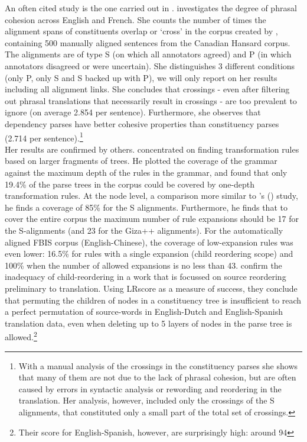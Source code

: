 \documentclass{report}
\theoremstyle{definition}
\theoremstyle{plain}
\def\citepos#1{\citeauthor{#1}'s (\citeyear{#1})}
\begin{document}
An often cited study is the one carried out in \cite{fox2002phrasal}. \citeauthor{fox2002phrasal} investigates the degree of phrasal cohesion across English and French. She counts the number of times the alignment spans of constituents overlap or `cross' in the corpus created by \cite{och2000improved}, containing 500 manually aligned sentences from the Canadian Hansard corpus. The alignments are of type S (on which all annotators agreed) and P (in which annotators disagreed or were uncertain). She distinguishes 3 different conditions (only P, only S and S backed up with P), we will only report on her results including all alignment links. She concludes that crossings - even after filtering out phrasal translations that necessarily result in crossings - are too prevalent to ignore (on average 2.854 per sentence). Furthermore, she observes that dependency parses have better cohesive properties than constituency parses (2.714 per sentence).\footnote{With a manual analysis of the crossings in the constituency parses she shows that many of them are not due to the lack of phrasal cohesion, but are often caused by errors in syntactic analysis or rewording and reordering in the translation. Her analysis, however, included only the crossings of the S alignments, that constituted only a small part of the total set of crossings.}\\
Her results are confirmed by others. \cite{galley2004s} concentrated on finding transformation rules based on larger fragments of trees. He plotted the coverage of the grammar against the maximum depth of the rules in the grammar, and found that only 19.4\% of the parse trees in the corpus could be covered by one-depth transformation rules. At the node level, a comparison more similar to \citepos{fox2002phrasal} study, he finds a coverage of 85\% for the S alignments. Furthermore, he finds that to cover the entire corpus the maximum number of rule expansions should be 17 for the S-alignments (and 23 for the Giza++ alignments). For the automatically aligned FBIS corpus (English-Chinese), the coverage of low-expansion rules was even lower: 16.5\% for rules with a single expansion (child reordering scope) and 100\% when the number of allowed expansions is no less than 43. \cite{khalilov2012statistical} confirm the inadequacy of child-reordering in a work that is focussed on source reordering preliminary to translation. Using LRscore \citep{birch2010lrscore} as a measure of success, they conclude that permuting the children of nodes in a constituency tree is insufficient to reach a perfect permutation of source-words in English-Dutch and English-Spanish translation data, even when deleting up to 5 layers of nodes in the parse tree is allowed.\footnote{Their score for English-Spanish, however, are surprisingly high: around 94}\\
\end{document}
